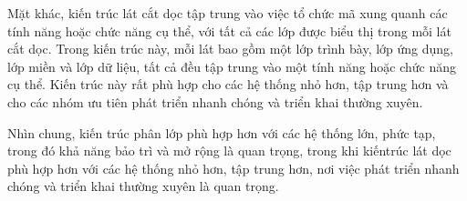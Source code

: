 Mặt khác, kiến ​​trúc lát cắt dọc tập trung vào việc tổ chức mã xung quanh các tính năng hoặc chức năng cụ thể, với tất cả các lớp được biểu thị trong mỗi lát cắt dọc. Trong kiến ​​trúc này, mỗi lát bao gồm một lớp trình bày, lớp ứng dụng, lớp miền và lớp dữ liệu, tất cả đều tập trung vào một tính năng hoặc chức năng cụ thể. Kiến trúc này rất phù hợp cho các hệ thống nhỏ hơn, tập trung hơn và cho các nhóm ưu tiên phát triển nhanh chóng và triển khai thường xuyên.

Nhìn chung, kiến ​​trúc phân lớp phù hợp hơn với các hệ thống lớn, phức tạp, trong đó khả năng bảo trì và mở rộng là quan trọng, trong khi kiến ​​trúc lát dọc phù hợp hơn với các hệ thống nhỏ hơn, tập trung hơn, nơi việc phát triển nhanh chóng và triển khai thường xuyên là quan trọng.

